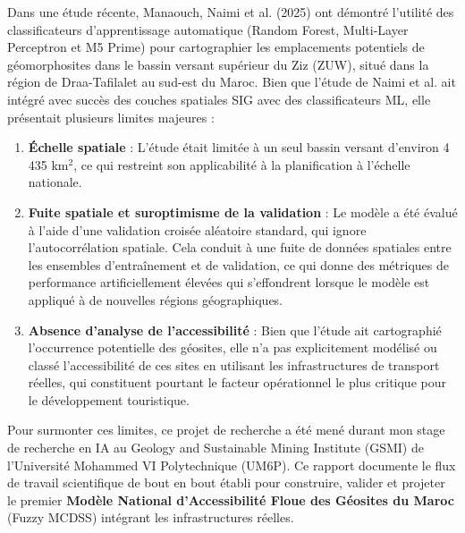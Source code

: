 \documentclass[11pt,twocolumn,a4paper]{article}
\begin{document}
Dans une étude récente, Manaouch, Naimi et al. (2025) ont démontré l'utilité des classificateurs d'apprentissage automatique (Random Forest, Multi-Layer Perceptron et M5 Prime) pour cartographier les emplacements potentiels de géomorphosites dans le bassin versant supérieur du Ziz (ZUW), situé dans la région de Draa-Tafilalet au sud-est du Maroc. Bien que l'étude de Naimi et al. ait intégré avec succès des couches spatiales SIG avec des classificateurs ML, elle présentait plusieurs limites majeures :
\begin{enumerate}
    \item \textbf{Échelle spatiale} : L'étude était limitée à un seul bassin versant d'environ 4\,435 km$^2$, ce qui restreint son applicabilité à la planification à l'échelle nationale.
    \item \textbf{Fuite spatiale et suroptimisme de la validation} : Le modèle a été évalué à l'aide d'une validation croisée aléatoire standard, qui ignore l'autocorrélation spatiale. Cela conduit à une fuite de données spatiales entre les ensembles d'entraînement et de validation, ce qui donne des métriques de performance artificiellement élevées qui s'effondrent lorsque le modèle est appliqué à de nouvelles régions géographiques.
    \item \textbf{Absence d'analyse de l'accessibilité} : Bien que l'étude ait cartographié l'occurrence potentielle des géosites, elle n'a pas explicitement modélisé ou classé l'accessibilité de ces sites en utilisant les infrastructures de transport réelles, qui constituent pourtant le facteur opérationnel le plus critique pour le développement touristique.
\end{enumerate}

Pour surmonter ces limites, ce projet de recherche a été mené durant mon stage de recherche en IA au Geology and Sustainable Mining Institute (GSMI) de l'Université Mohammed VI Polytechnique (UM6P). Ce rapport documente le flux de travail scientifique de bout en bout établi pour construire, valider et projeter le premier \textbf{Modèle National d'Accessibilité Floue des Géosites du Maroc} (Fuzzy MCDSS) intégrant les infrastructures réelles.
\end{document}
